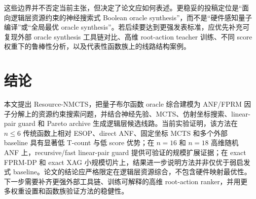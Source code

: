 \documentclass[UTF8,fontset=macnew,11pt]{ctexart}
\newcommand{\method}{Resource-NMCTS}
\begin{document}
这些边界并不否定当前主张，但决定了论文应如何表述。更稳妥的投稿定位是“面向逻辑层资源约束的神经搜索式 Boolean oracle synthesis”，而不是“硬件感知量子编译”或“全局最优 oracle synthesis”。若后续要达到更强发表标准，应优先补充可复现外部 oracle synthesis 工具链对比、高维 root-action teacher 训练、不同 score 权重下的鲁棒性分析，以及代表性函数族上的线路结构案例。

\section{结论}

本文提出 \method{}，把量子布尔函数 oracle 综合建模为 ANF/FPRM 因子分解上的资源约束搜索问题，并结合神经先验、MCTS、仿射坐标搜索、linear-pair guard 和 Pareto archive 生成逻辑层候选线路。当前实验证明，该方法在 $n\leq 6$ 传统函数上相对 ESOP、direct ANF、固定坐标 MCTS 和多个外部 baseline 具有显著低 T-count 与低 score 优势；在 $n=16$ 和 $n=18$ 高维随机 ANF 上，recursive/fast linear-pair guard 提供可验证的规模扩展证据；在 exact FPRM-DP 和 exact XAG 小规模切片上，结果进一步说明方法并非仅优于弱启发式 baseline。论文的结论应严格限定在逻辑层资源综合，不包含硬件映射最优性。下一步需要补齐更强外部工具链、训练可解释的高维 root-action ranker，并用更多权重设置和函数族验证方法的稳健性。
\end{document}
